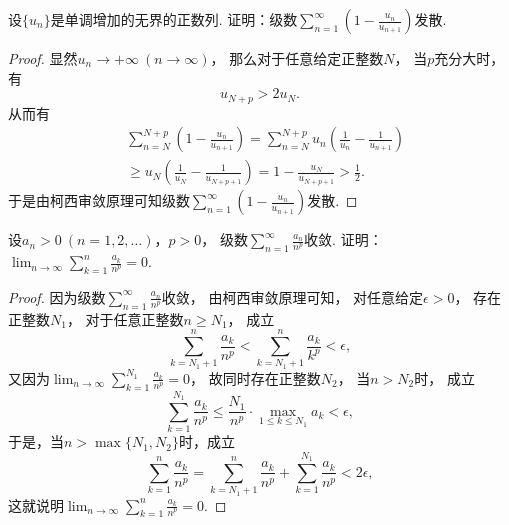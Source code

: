 \begin{example}
设\(\{u_n\}\)是单调增加的无界的正数列.
证明：级数\(\sum_{n=1}^\infty \left(1-\frac{u_n}{u_{n+1}}\right)\)发散.
\begin{proof}
显然\(u_n\to+\infty\ (n\to\infty)\)，
那么对于任意给定正整数\(N\)，
当\(p\)充分大时，
有\[
	u_{N+p} > 2 u_N.
\]
从而有\begin{align*}
	&\sum_{n=N}^{N+p} \left(1-\frac{u_n}{u_{n+1}}\right)
	= \sum_{n=N}^{N+p} u_n \left(\frac1{u_n}-\frac1{u_{n+1}}\right) \\
	&\geq u_N \left(\frac1{u_N}-\frac1{u_{N+p+1}}\right)
	= 1-\frac{u_N}{u_{N+p+1}}
	> \frac12.
\end{align*}
于是由{柯西审敛原理}可知级数\(\sum_{n=1}^\infty \left(1-\frac{u_n}{u_{n+1}}\right)\)发散.
\end{proof}
\end{example}

\begin{example}
设\(a_n>0\ (n=1,2,\dotsc)\)，\(p>0\)，
级数\(\sum_{n=1}^\infty \frac{a_n}{n^p}\)收敛.
证明：\(\lim_{n\to\infty} \sum_{k=1}^n \frac{a_k}{n^p} = 0\).
\begin{proof}
因为级数\(\sum_{n=1}^\infty \frac{a_n}{n^p}\)收敛，
由{柯西审敛原理}可知，
对任意给定\(\epsilon>0\)，
存在正整数\(N_1\)，
对于任意正整数\(n \geq N_1\)，
成立\[
	\sum_{k=N_1+1}^n \frac{a_k}{n^p}
	< \sum_{k=N_1+1}^n \frac{a_k}{k^p}
	< \epsilon,
\]
又因为\(\lim_{n\to\infty} \sum_{k=1}^{N_1} \frac{a_k}{n^p} = 0\)，
故同时存在正整数\(N_2\)，
当\(n > N_2\)时，
成立\[
	\sum_{k=1}^{N_1} \frac{a_k}{n^p}
	\leq \frac{N_1}{n^p} \cdot \max_{1 \leq k \leq N_1} a_k
	< \epsilon,
\]
于是，当\(n>\max\{N_1,N_2\}\)时，成立\[
	\sum_{k=1}^n \frac{a_k}{n^p}
	= \sum_{k=N_1+1}^n \frac{a_k}{n^p}
	+ \sum_{k=1}^{N_1} \frac{a_k}{n^p}
	< 2\epsilon,
\]
这就说明\(\lim_{n\to\infty} \sum_{k=1}^n \frac{a_k}{n^p} = 0\).
\end{proof}
\end{example}

